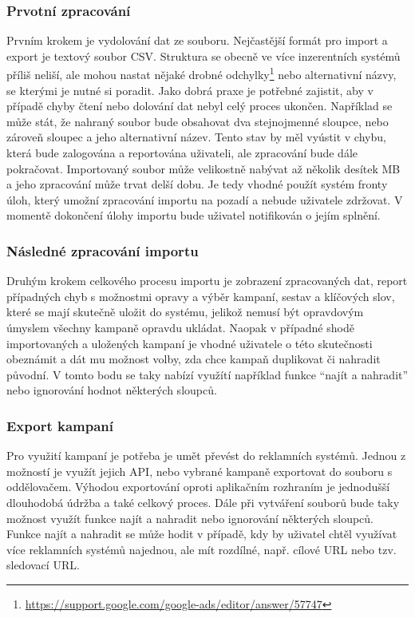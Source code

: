 \subsubsection{Prvotní zpracování}
Prvním krokem je vydolování dat ze souboru. Nejčastější formát pro import a export je textový soubor CSV. Struktura se obecně ve více inzerentních
systémů příliš neliší, ale mohou nastat nějaké drobné odchylky\footnote{\href{https://support.google.com/google-ads/editor/answer/57747}{https://support.google.com/google-ads/editor/answer/57747}}
nebo alternativní názvy, se kterými je nutné si poradit. Jako dobrá praxe je potřebné zajistit, aby v případě chyby čtení nebo dolování dat nebyl celý
proces ukončen. Například se může stát, že nahraný soubor bude obsahovat dva stejnojmenné sloupce, nebo zároveň sloupec a jeho alternativní název. Tento
stav by měl vyústit v chybu, která bude zalogována a reportována uživateli, ale zpracování bude dále pokračovat. 
Importovaný soubor může velikostně nabývat až několik desítek MB a jeho zpracování může trvat delší
dobu. Je tedy vhodné použít systém fronty úloh, který umožní zpracování importu na pozadí a nebude uživatele zdržovat. V momentě dokončení úlohy importu
bude uživatel notifikován o jejím splnění.

\subsubsection{Následné zpracování importu}
Druhým krokem celkového procesu importu je zobrazení zpracovaných dat, report případných chyb s možnostmi opravy a výběr kampaní, sestav a klíčových slov,
které se mají skutečně uložit do systému, jelikož nemusí být opravdovým úmyslem všechny kampaně opravdu ukládat.
Naopak v případné shodě importovaných a uložených kampaní je vhodné uživatele o této skutečnosti
obeznámit a dát mu možnost volby, zda chce kampaň duplikovat či nahradit původní. 
V tomto bodu se taky nabízí využítí například funkce \enquote{najít a nahradit} nebo ignorování hodnot některých sloupců.

\subsubsection{Export kampaní}
Pro využití kampaní je potřeba je umět převést do reklamních systémů. Jednou z možností je využít jejich API, nebo vybrané kampaně exportovat do souboru
s oddělovačem. Výhodou exportování oproti aplikačním rozhraním je jednodušší dlouhodobá údržba a také celkový proces. Dále při vytváření souborů
bude taky možnost využít funkce najít a nahradit nebo ignorování některých sloupců. Funkce najít a nahradit se může hodit v případě, kdy by uživatel chtěl využívat
více reklamních systémů najednou, ale mít rozdílné, např. cílové URL nebo tzv. sledovací URL.

